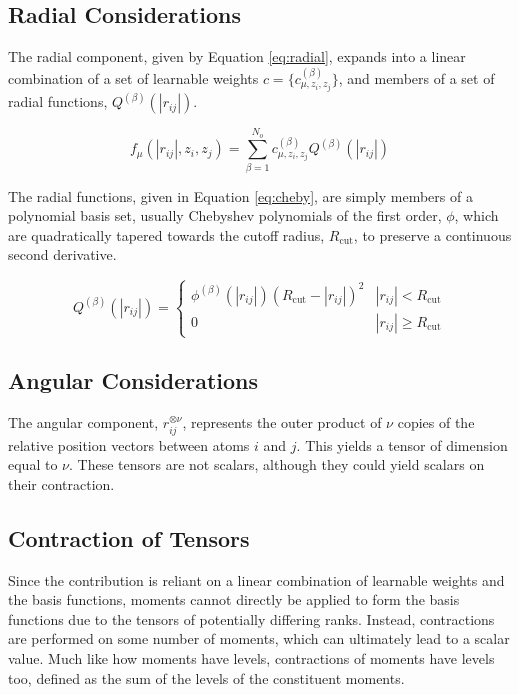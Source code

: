 \documentclass[9pt,twocolumn,twoside]{opticajnl}
\begin{document}
\subsection{Radial Considerations}
The radial component, given by Equation \ref{eq:radial}, expands into a linear combination of a set of learnable weights $c = \{c^{(\beta)} _ {\mu,z_i,z_j} \}$, and members of a set of radial functions, $Q^{(\beta)}(|r_{ij}|)$.

\begin{equation} \label{eq:radial}
  f_\mu (|r_{ij}|,z_i,z_j) = \sum ^ {N_o} _ {\beta = 1} c^{(\beta)} _ {\mu,z_i,z_j}  Q^{(\beta)}(|r_{ij}|)
\end{equation}

The radial functions, given in Equation \ref{eq:cheby}, are simply members of a polynomial basis set, usually Chebyshev polynomials of the first order, $\phi$, which are quadratically tapered towards the cutoff radius, $R_{\textrm{cut}}$, to preserve a continuous second derivative.

\begin{equation} \label{eq:cheby}
  Q^{(\beta)}(|r_{ij}|)=  \begin{cases}
    \phi ^{(\beta)}(|r_{ij}|) (R_{\textrm{cut}} - |r_{ij}|)^2& |r_{ij}| < R_{\textrm{cut}} \\
    0 & |r_{ij}| \geq R_{\textrm{cut}} 
\end{cases}
\end{equation}

\subsection{Angular Considerations}
The angular component, $r_{ij} ^{\otimes \nu}$, represents the outer product of $\nu$ copies of the relative position vectors between atoms $i$ and $j$. This yields a tensor of dimension equal to $\nu$. These tensors are not scalars, although they could yield scalars on their contraction.

\subsection{Contraction of Tensors}
Since the contribution is reliant on a linear combination of learnable weights and the basis functions, moments cannot directly be applied to form the basis functions due to the tensors of potentially differing ranks. Instead, contractions are performed on some number of moments, which can ultimately lead to a scalar value. Much like how moments have levels, contractions of moments have levels too, defined as the sum of the levels of the constituent moments.
\end{document}
